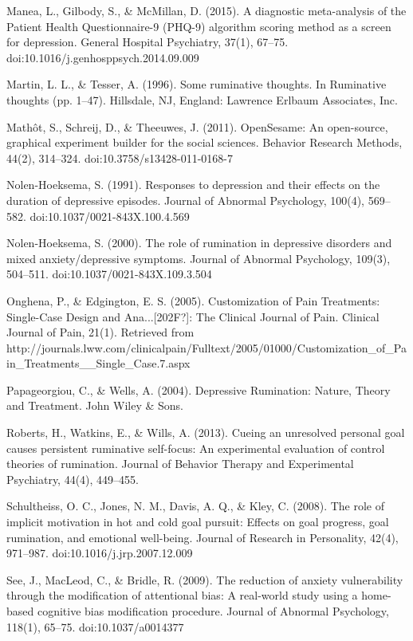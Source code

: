 \documentclass[man,a4paper,biblatex]{apa6}
\begin{document}
Manea, L., Gilbody, S., \& McMillan, D. (2015). A diagnostic meta-analysis of the Patient Health Questionnaire-9 (PHQ-9) algorithm scoring method as a screen for depression. General Hospital Psychiatry, 37(1), 67--75. doi:10.1016/j.genhosppsych.2014.09.009

Martin, L. L., \& Tesser, A. (1996). Some ruminative thoughts. In Ruminative thoughts (pp. 1--47). Hillsdale, NJ, England: Lawrence Erlbaum Associates, Inc.

Math\^ot, S., Schreij, D., \& Theeuwes, J. (2011). OpenSesame: An open-source, graphical experiment builder for the social sciences. Behavior Research Methods, 44(2), 314--324. doi:10.3758/s13428-011-0168-7

Nolen-Hoeksema, S. (1991). Responses to depression and their effects on the duration of depressive episodes. Journal of Abnormal Psychology, 100(4), 569--582. doi:10.1037/0021-843X.100.4.569

Nolen-Hoeksema, S. (2000). The role of rumination in depressive disorders and mixed anxiety/depressive symptoms. Journal of Abnormal Psychology, 109(3), 504--511. doi:10.1037/0021-843X.109.3.504

Onghena, P., \& Edgington, E. S. (2005). Customization of Pain Treatments: Single-Case Design and Ana...[202F?]: The Clinical Journal of Pain. Clinical Journal of Pain, 21(1). Retrieved from http://journals.lww.com/clinicalpain/Fulltext/2005/01000/Customization\_of\_Pain\_Treatments\_\_Single\_Case.7.aspx

Papageorgiou, C., \& Wells, A. (2004). Depressive Rumination: Nature, Theory and Treatment. John Wiley \& Sons.

Roberts, H., Watkins, E., \& Wills, A. (2013). Cueing an unresolved personal goal causes persistent ruminative self-focus: An experimental evaluation of control theories of rumination. Journal of Behavior Therapy and Experimental Psychiatry, 44(4), 449--455.

Schultheiss, O. C., Jones, N. M., Davis, A. Q., \& Kley, C. (2008). The role of implicit motivation in hot and cold goal pursuit: Effects on goal progress, goal rumination, and emotional well-being. Journal of Research in Personality, 42(4), 971--987. doi:10.1016/j.jrp.2007.12.009

See, J., MacLeod, C., \& Bridle, R. (2009). The reduction of anxiety vulnerability through the modification of attentional bias: A real-world study using a home-based cognitive bias modification procedure. Journal of Abnormal Psychology, 118(1), 65--75. doi:10.1037/a0014377
\end{document}
